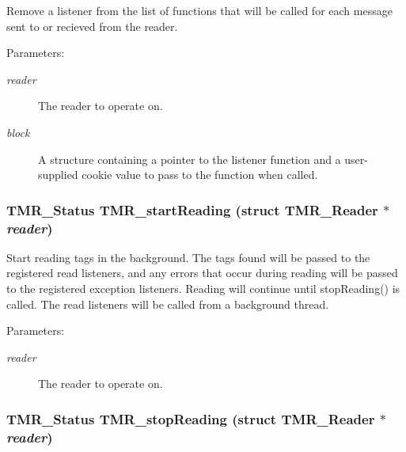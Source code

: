Remove a listener from the list of functions that will be called for each message sent to or recieved from the reader.

\begin{Desc}
\item[Parameters:]
\begin{description}
\item[{\em reader}]The reader to operate on. \item[{\em block}]A structure containing a pointer to the listener function and a user-supplied cookie value to pass to the function when called. \end{description}
\end{Desc}
\hypertarget{group__reader_gad5e5df913bb9150c9d6c1fc12bebe7e}{
\subsubsection[{TMR\_\-startReading}]{\setlength{\rightskip}{0pt plus 5cm}TMR\_\-Status TMR\_\-startReading (struct {\bf TMR\_\-Reader} $\ast$ {\em reader})}}
\label{group__reader_gad5e5df913bb9150c9d6c1fc12bebe7e}


Start reading tags in the background. The tags found will be passed to the registered read listeners, and any errors that occur during reading will be passed to the registered exception listeners. Reading will continue until stopReading() is called. The read listeners will be called from a background thread.

\begin{Desc}
\item[Parameters:]
\begin{description}
\item[{\em reader}]The reader to operate on. \end{description}
\end{Desc}
\hypertarget{group__reader_g82c3f389ceda58871e9c35975390231d}{
\subsubsection[{TMR\_\-stopReading}]{\setlength{\rightskip}{0pt plus 5cm}TMR\_\-Status TMR\_\-stopReading (struct {\bf TMR\_\-Reader} $\ast$ {\em reader})}}
\label{group__reader_g82c3f389ceda58871e9c35975390231d}


